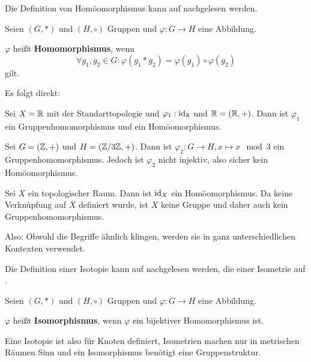 \begin{solution}[\ref{ub3:meinsExtra}]
    Die Definition von Homöomorphismus kann auf 
    nachgelesen werden.

    \begin{definition}%
        Seien $(G, *)$ und $(H, \circ)$ Gruppen und 
        $\varphi:G \rightarrow H$ eine Abbildung.

        $\varphi$ heißt \textbf{Homomorphismus}, wenn
        \[\forall g_1, g_2 \in G: \varphi(g_1 * g_2) = \varphi(g_1) \circ \varphi(g_2)\]
        gilt.
    \end{definition}

    Es folgt direkt:
    \begin{bspenum}
        \item Sei $X = \mathbb{R}$ mit der Standarttopologie und $\varphi_1: \textnormal{id}_{\mathbb{R}}$ und $\mathbb{R} = (\mathbb{R},+)$. Dann ist $\varphi_1$ ein Gruppenhomomorphismus und ein Homöomorphismus.
        \item Sei $G = (\mathbb{Z}, +)$ und $H = (\mathbb{Z} / 3 \mathbb{Z}, +)$. Dann ist $\varphi_2 : G \rightarrow H, x \mapsto x \mod 3$ ein Gruppenhomomorphismus.
              Jedoch ist $\varphi_2$ nicht injektiv, also sicher kein Homöomorphismus.
        \item Sei $X$ ein topologischer Raum. Dann ist $\textnormal{id}_X$ ein Homöomorphismus. Da keine Verknüpfung auf $X$ definiert wurde, ist $X$ keine Gruppe und daher auch kein Gruppenhomomorphismus.
    \end{bspenum}

    Also: Obwohl die Begriffe ähnlich klingen, werden sie in ganz unterschiedlichen
    Kontexten verwendet.
\end{solution}

\begin{solution}[\ref{ub3:meinsExtra2}]
    Die Definition einer Isotopie kann auf  nachgelesen
    werden, die einer Isometrie auf .
    
    \begin{definition}%
        Seien $(G, *)$ und $(H, \circ)$ Gruppen und 
        $\varphi:G \rightarrow H$ eine Abbildung.

        $\varphi$ heißt \textbf{Isomorphismus}, wenn $\varphi$ ein bijektiver
        Homomorphismus ist.
    \end{definition}

    Eine Isotopie ist also für Knoten definiert, Isometrien machen nur in 
    metrischen Räumen Sinn und ein Isomorphismus benötigt eine Gruppenstruktur.
\end{solution}

